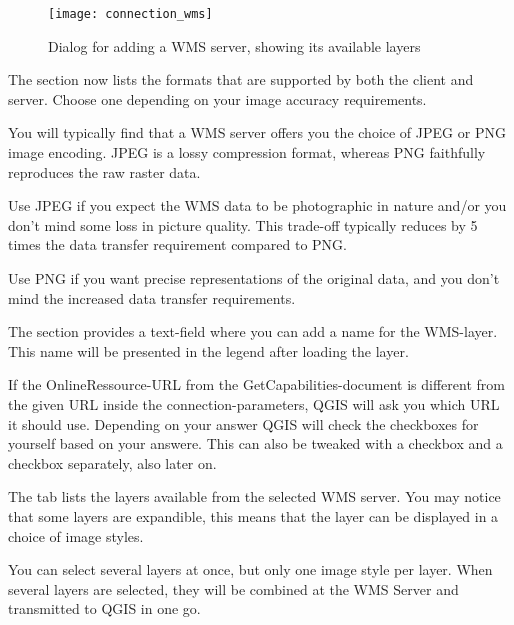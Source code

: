 \begin{figure}[ht]
  \centering
  \texttt{[image: connection\_wms]}
  \caption{Dialog for adding a WMS server, showing its available layers \nixcaption}\label{fig:connection_wms}
\end{figure}


The  section now lists the formats that are supported by both
the client and server.  Choose one depending on your image accuracy requirements.

\begin{Tip}[ht]\caption{\textsc{Image Encoding}}
You will typically find that a WMS server offers you the choice
of JPEG or PNG image encoding.  JPEG is a lossy compression format,
whereas PNG faithfully reproduces the raw raster data.

Use JPEG if you expect the WMS data to be photographic in nature and/or you don't
mind some loss in picture quality.  This trade-off typically reduces by 5 times
the data transfer requirement compared to PNG.

Use PNG if you want precise representations of the original data, and you don't mind
the increased data transfer requirements.
\end{Tip}


The section provides a text-field where you can add a name
for the WMS-layer. This name will be presented in the legend after loading
the layer.

If the OnlineRessource-URL from the GetCapabilities-document is different
from the given URL inside the connection-parameters, QGIS will ask you
which URL it should use. Depending on your answer QGIS will check the
checkboxes for yourself based on your answere. This can also be tweaked with a
 checkbox and a
 checkbox separately, also later on.


 \label{ogc-wms-layers}

The  tab lists the layers available from the selected
WMS server.  You may notice that some layers are expandible, this means
that the layer can be displayed in a choice of image styles.

You can select several layers at once, but only one image style per layer.
When several layers are selected, they will be combined at the WMS Server
and transmitted to QGIS in one go.


